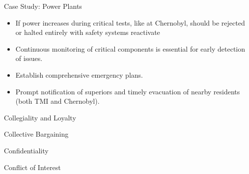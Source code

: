 \documentclass[11pt]{beamer}
\begin{document}
\begin{frame}[t,allowframebreaks]{Case Study: Power Plants}
\begin{itemize}
            \item If power increases during critical tests, like at Chernobyl, should be rejected or halted entirely
            with safety systems reactivate
            \item Continuous monitoring of critical components is essential for early detection of issues.
            \item Establish comprehensive emergency plans.
            \item Prompt notification of superiors and timely evacuation of nearby residents (both TMI and Chernobyl).
        \end{itemize}
    \end{frame}

    \begin{frame}[t]{Collegiality and Loyalty}
    \end{frame}

    \begin{frame}[t]{Collective Bargaining}
    \end{frame}

    \begin{frame}[t]{Confidentiality}
    \end{frame}

    \begin{frame}[t]{Conflict of Interest}
    \end{frame}
\end{document}
